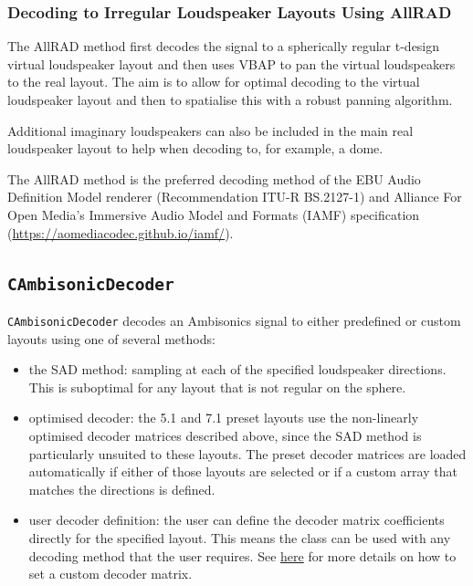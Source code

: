 \documentclass[12pt]{report}
\newcommand{\code}[1]{\texttt{#1}}
\begin{document}
\subsubsection{Decoding to Irregular Loudspeaker Layouts Using AllRAD}

The AllRAD method \cite{Zotter2012a} first decodes the signal to a spherically regular t-design virtual loudspeaker layout and then uses VBAP \cite{Pulkki1997} to pan the virtual loudspeakers to the real layout.
The aim is to allow for optimal decoding to the virtual loudspeaker layout and then to spatialise this with a robust panning algorithm.

Additional imaginary loudspeakers can also be included in the main real loudspeaker layout to help when decoding to, for example, a dome.

The AllRAD method is the preferred decoding method of the EBU Audio Definition Model renderer (Recommendation ITU-R BS.2127-1) and Alliance For Open Media's Immersive Audio Model and Formats (IAMF) specification (\href{https://aomediacodec.github.io/iamf/}{https://aomediacodec.github.io/iamf/}).

\subsection{\code{CAmbisonicDecoder}}\label{CAmbisonicDecoder}

\code{CAmbisonicDecoder} decodes an Ambisonics signal to either predefined or custom layouts using one of several methods:

\begin{itemize}
    \item the SAD method: sampling at each of the specified loudspeaker directions. This is suboptimal for any layout that is not regular on the sphere.
    \item optimised decoder: the 5.1 and 7.1 preset layouts use the non-linearly optimised decoder matrices described above, since the SAD method is particularly unsuited to these layouts. The preset decoder matrices are loaded automatically if either of those layouts are selected or if a custom array that matches the directions is defined.
    \item user decoder definition: the user can define the decoder matrix coefficients directly for the specified layout. This means the class can be used with any decoding method that the user requires. See \href{#cambisonicdecoder-set-custom-decoder-coefficients}{here} for more details on how to set a custom decoder matrix.
\end{itemize}
\end{document}
